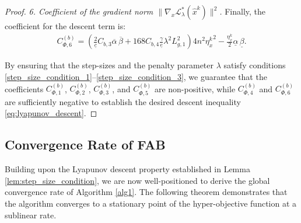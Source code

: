 \documentclass{article}
\theoremstyle{plain}
\theoremstyle{definition}
\theoremstyle{remark}
\begin{document}
\begin{proof}
    \textit{6. Coefficient of the gradient norm $\|\nabla_{x} \mathcal{L}_{\lambda}^{*}(\hat{x}^k)\|^2$.}
    Finally, the coefficient for the descent term is:
    \begin{align*}
        C_{\Phi,6}^{(b)} = \left(\frac{2}{\underline{c}}C_{b,3}\overline{\alpha}\, \overline{\beta} + 168C_{b,4}\frac{\gamma}{\underline{e}}\lambda^{2}L_{g,1}^{2}\right)4n^{2}{\eta_{x}^{k}}^{2} - \frac{\eta_x^{k}}{2}\underline{\alpha}\,\underline{\beta}.
    \end{align*}
    
By ensuring that the step-sizes and the penalty parameter $\lambda$ satisfy conditions \eqref{step_size_condition_1}--\eqref{step_size_condition_3}, we guarantee that the coefficients $C_{\Phi,1}^{(b)}$, $C_{\Phi,2}^{(b)}$, $C_{\Phi,3}^{(b)}$, and $C_{\Phi,5}^{(b)}$ are non-positive, while $C_{\Phi,4}^{(b)}$ and $C_{\Phi,6}^{(b)}$ are sufficiently negative to establish the desired descent inequality \eqref{eq:lyapunov_descent}.

\end{proof}
\subsection{Convergence Rate of FAB}\label{app:fab_rate}
Building upon the Lyapunov descent property established in Lemma \ref{lem:step_size_condition}, we are now well-positioned to derive the global convergence rate of Algorithm \ref{alg1}. The following theorem demonstrates that the algorithm converges to a stationary point of the hyper-objective function at a sublinear rate.
\end{document}
